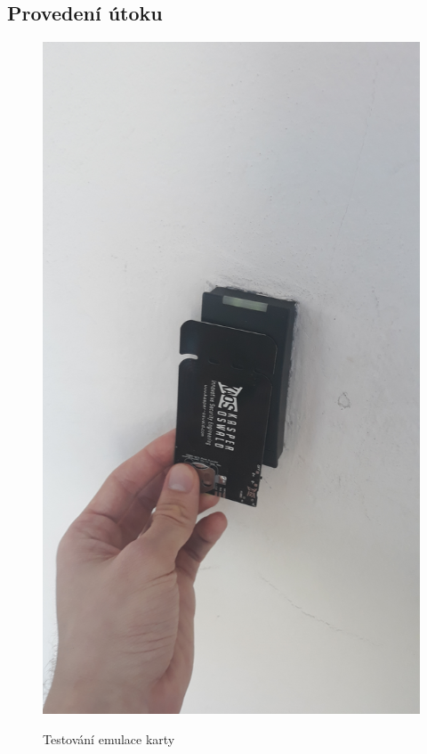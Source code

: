 \subsection{Provedení útoku}
\begin{figure}[ht]\centering
  \centering
  \includegraphics[width=\linewidth, angle=270]{obrazky-figures/obrazekPokusEmulace.jpg}\\[1pt]  
  \caption{Testování emulace karty}    
  \label{obrazekPokusEmulace}
\end{figure}
